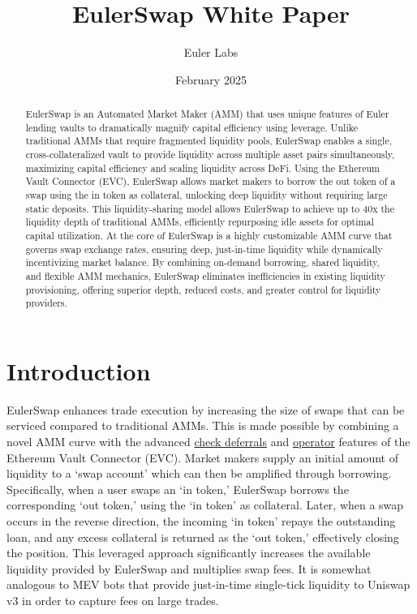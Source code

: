 \documentclass{article}
\title{EulerSwap White Paper}
\author{Euler Labs}  %
\date{February 2025}
\begin{document}
\maketitle

\begin{abstract}    
    EulerSwap is an Automated Market Maker (AMM) that uses unique features of Euler lending vaults to dramatically magnify capital efficiency using leverage. Unlike traditional AMMs that require fragmented liquidity pools, EulerSwap enables a single, cross-collateralized vault to provide liquidity across multiple asset pairs simultaneously, maximizing capital efficiency and scaling liquidity across DeFi. Using the Ethereum Vault Connector (EVC), EulerSwap allows market makers to borrow the out token of a swap using the in token as collateral, unlocking deep liquidity without requiring large static deposits. This liquidity-sharing model allows EulerSwap to achieve up to 40x the liquidity depth of traditional AMMs, efficiently repurposing idle assets for optimal capital utilization. At the core of EulerSwap is a highly customizable AMM curve that governs swap exchange rates, ensuring deep, just-in-time liquidity while dynamically incentivizing market balance. By combining on-demand borrowing, shared liquidity, and flexible AMM mechanics, EulerSwap eliminates inefficiencies in existing liquidity provisioning, offering superior depth, reduced costs, and greater control for liquidity providers.
\end{abstract}

\section{Introduction}

EulerSwap enhances trade execution by increasing the size of swaps that can be serviced compared to traditional AMMs. This is made possible by combining a novel AMM curve with the advanced \href{https://docs.euler.finance/developers/evc/keyConcepts?_highlight=operator#batch-operations}{check deferrals} and \href{https://docs.euler.finance/developers/evc/keyConcepts?_highlight=operator#operators}{operator} features of the Ethereum Vault Connector (EVC). Market makers supply an initial amount of liquidity to a `swap account' which can then be amplified through borrowing. Specifically, when a user swaps an `in token,' EulerSwap borrows the corresponding `out token,' using the `in token' as collateral. Later, when a swap occurs in the reverse direction, the incoming `in token' repays the outstanding loan, and any excess collateral is returned as the `out token,' effectively closing the position. This leveraged approach significantly increases the available liquidity provided by EulerSwap and multiplies swap fees. It is somewhat analogous to MEV bots that provide just-in-time single-tick liquidity to Uniswap v3 in order to capture fees on large trades.
\end{document}
